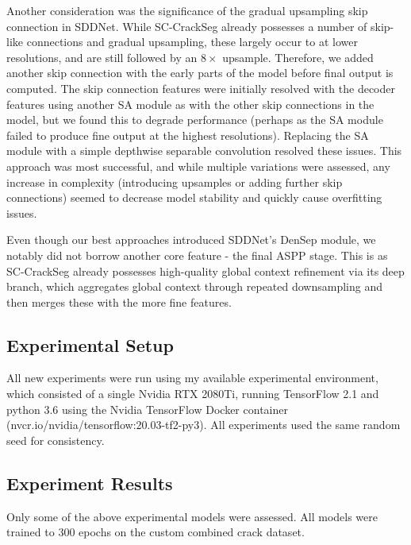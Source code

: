 \documentclass[a4paper,12pt]{report}
\begin{document}
Another consideration was the significance of the gradual upsampling skip connection in SDDNet. While SC-CrackSeg already possesses a number of skip-like connections and gradual upsampling, these largely occur to at lower resolutions, and are still followed by an $8 \times$ upsample. Therefore, we added another skip connection with the early parts of the model before final output is computed. The skip connection features were initially resolved with the decoder features using another SA module as with the other skip connections in the model, but we found this to degrade performance (perhaps as the SA module failed to produce fine output at the highest resolutions). Replacing the SA module with a simple depthwise separable convolution resolved these issues. This approach was most successful, and while multiple variations were assessed, any increase in complexity (introducing upsamples or adding further skip connections) seemed to decrease model stability and quickly cause overfitting issues.

Even though our best approaches introduced SDDNet's DenSep module, we notably did not borrow another core feature - the final ASPP stage. This is as SC-CrackSeg already possesses high-quality global context refinement via its deep branch, which aggregates global context through repeated downsampling and then merges these with the more fine features.

\subsection{Experimental Setup}
All new experiments were run using my available experimental environment, which consisted of a single Nvidia RTX 2080Ti, running TensorFlow 2.1 and python 3.6 using the Nvidia TensorFlow Docker container (nvcr.io/nvidia/tensorflow:20.03-tf2-py3). All experiments used the same random seed for consistency.

\subsection{Experiment Results}

Only some of the above experimental models were assessed. All models were trained to 300 epochs on the custom combined crack dataset.
\end{document}
